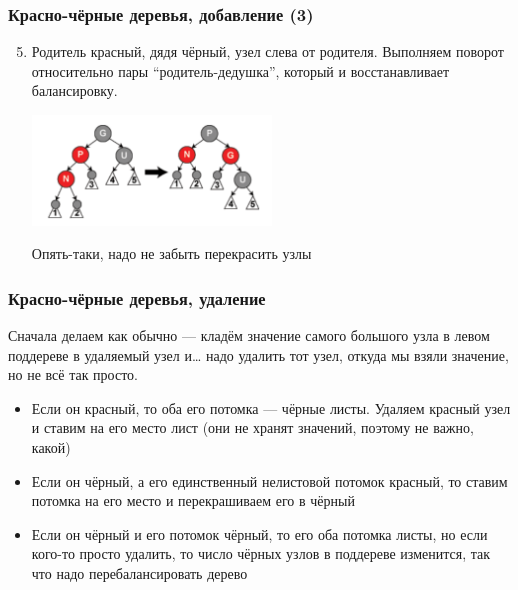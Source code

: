 \documentclass[xetex,mathserif,serif]{beamer}
\begin{document}
    \begin{frame}
        \frametitle{Красно-чёрные деревья, добавление (3)}
        \begin{enumerate}
            \setcounter{enumi}{4}
            \item Родитель красный, дядя чёрный, узел слева от родителя. Выполняем поворот относительно пары ``родитель-дедушка'', который и восстанавливает балансировку.
            \begin{center}
                \includegraphics[width=0.5\textwidth]{addition-to-red-black-tree3.png}
            \end{center}
            Опять-таки, надо не забыть перекрасить узлы
        \end{enumerate}
    \end{frame}

    \begin{frame}
        \frametitle{Красно-чёрные деревья, удаление}
        Сначала делаем как обычно --- кладём значение самого большого узла в левом поддереве в удаляемый узел и… надо удалить тот узел, откуда мы взяли значение, но не всё так просто.
        \begin{itemize}
            \item Если он красный, то оба его потомка --- чёрные листы. Удаляем красный узел и ставим на его место лист (они не хранят значений, поэтому не важно, какой)
            \item Если он чёрный, а его единственный нелистовой потомок красный, то ставим потомка на его место и перекрашиваем его в чёрный
            \item Если он чёрный и его потомок чёрный, то его оба потомка листы, но если кого-то просто удалить, то число чёрных узлов в поддереве изменится, так что надо перебалансировать дерево
        \end{itemize}
    \end{frame}
\end{document}
